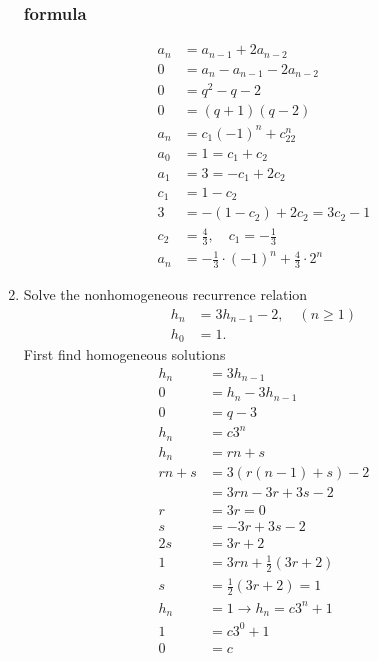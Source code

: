 \documentclass{article}
\begin{document}
\begin{enumerate}
  \subsubsection*{formula}
  \begin{align*}
    a_n&=a_{n-1}+2a_{n-2}\\
    0&=a_n-a_{n-1}-2a_{n-2}\\
    0&=q^2-q-2\\
    0&=(q+1)(q-2)\\
    a_n&=c_1({-1})^n+c_22^n\\
    a_0&=1=c_1+c_2\\
    a_1&=3=-c_1+2c_2\\
    c_1&=1-c_2\\
    3&=-(1-c_2)+2c_2=3c_2-1\\
    c_2&=\frac{4}{3},\quad c_1=-\frac{1}{3}\\
    a_n&=-\frac{1}{3}\cdot(-1)^n+\frac{4}{3}\cdot2^n
  \end{align*}
%
  \setcounter{enumi}{43}
  \item
  Solve the nonhomogeneous recurrence relation
  \begin{align*}
    h_n&=3h_{n-1}-2,\quad(n\ge1)\\
    h_0&=1.
  \end{align*}
  First find homogeneous solutions
  \begin{align*}
    h_n&=3h_{n-1}\\
    0&=h_n-3h_{n-1}\\
    0&=q-3\\
    h_n&=c3^n\\
    h_n&=rn+s\\
    rn+s&=3(r(n-1)+s)-2\\
    &=3rn-3r+3s-2\\
    r&=3r=0\\
    s&=-3r+3s-2\\
    2s&=3r+2\\
    1&=3rn+\frac{1}{2}(3r+2)\\
    s&=\frac{1}{2}(3r+2)=1\\
    h_n&=1\to h_n=c3^n+1\\
    1&=c3^0+1\\
    0&=c\\

\end{align*}
\end{enumerate}
\end{document}
